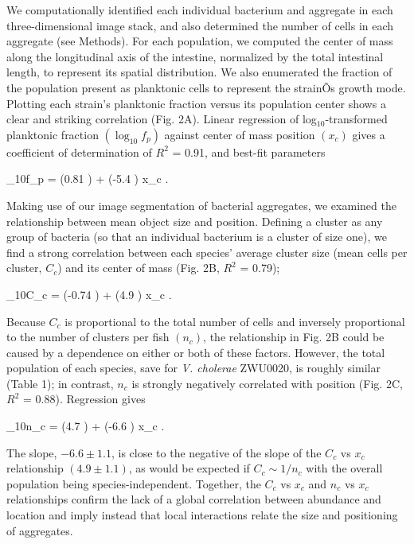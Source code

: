 We computationally identified each individual bacterium and aggregate in each three-dimensional image stack, and also determined the number of cells in each aggregate \cite{Jemielita2014} (see Methods). For each population, we computed the center of mass along the longitudinal axis of the intestine, normalized by the total intestinal length, to represent its spatial distribution. We also enumerated the fraction of the population present as planktonic cells to represent the strainÕs growth mode. Plotting each strain's planktonic fraction versus its population center shows a clear and striking correlation (Fig. 2A). Linear regression of log$_{10}$-transformed planktonic fraction $(\log_{10}f_p)$ against center of mass position $(x_c)$ gives a coefficient of determination of $R^2$ = 0.91, and best-fit parameters	

\be
        	 \log_{10}f_p = (0.81 ) + (-5.4 ) x_c .	
\ee

Making use of our image segmentation of bacterial aggregates, we examined the relationship between mean object size and position. Defining a cluster as any group of bacteria (so that an individual bacterium is a cluster of size one), we find a strong correlation between each species' average cluster size (mean cells per cluster, $C_c$) and its center of mass (Fig. 2B, $R^2$ = 0.79);

\be
        	 \log_{10}C_c = (-0.74 ) + (4.9 ) x_c .
\ee	


Because $C_c$ is proportional to the total number of cells and inversely proportional to the number of clusters per fish $(n_c)$, the relationship in Fig. 2B could be caused by a dependence on either or both of these factors. However, the total population of each species, save for \textit{V. cholerae} ZWU0020, is roughly similar (Table 1); in contrast, $n_c$ is strongly negatively correlated with position (Fig. 2C, $R^2$ = 0.88). Regression gives

\be
        \log_{10}n_c = (4.7 ) + (-6.6 ) x_c .
\ee	

The slope, $-6.6 \pm 1.1$, is close to the negative of the slope of the $C_c$ vs $x_c$ relationship $(4.9 \pm 1.1)$, as would be expected if $C_c \sim 1/n_c$ with the overall population being species-independent. Together, the $C_c$ vs $x_c$  and $n_c$ vs $x_c$ relationships confirm the lack of a global correlation between abundance and location and imply instead that local interactions relate the size and positioning of aggregates. 	


